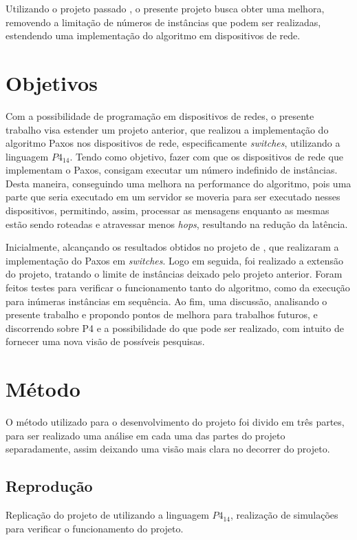 \documentclass[
    12pt,
    openright, 
    oneside,
    a4paper,
    french,
    english,
    brazil
    ]{facom-ufu-abntex2}
\theoremstyle{definition}
\begin{document}
Utilizando o projeto passado \cite{dang2016paxos}, o presente projeto busca obter uma melhora, removendo a limitação
de números de instâncias que podem ser realizadas, estendendo uma implementação do algoritmo em dispositivos de rede.

\section{Objetivos}
Com a possibilidade de programação em dispositivos de redes, o presente trabalho 
visa estender um projeto anterior, que realizou a implementação do algoritmo Paxos nos 
dispositivos de rede, especificamente \emph{switches}, utilizando a linguagem $P4_{14}$. 
Tendo como objetivo, fazer com que os dispositivos de rede que implementam o Paxos,
consigam executar um número indefinido de instâncias.
Desta maneira, conseguindo uma melhora na performance do algoritmo, pois uma parte 
que seria executado em um servidor se moveria para ser executado nesses dispositivos, permitindo,
assim, processar as mensagens enquanto as mesmas estão sendo roteadas e atravessar menos
\emph{hops}, resultando na redução da latência.

Inicialmente, alcançando os resultados obtidos no projeto de \cite{dang2016paxos}, 
que realizaram a implementação do Paxos em \emph{switches}. Logo em seguida, foi realizado a extensão
do projeto, tratando o limite de instâncias deixado pelo projeto anterior. Foram feitos testes
para verificar o funcionamento tanto do algoritmo, como da execução para inúmeras instâncias em sequência.
Ao fim, uma discussão, analisando o presente trabalho e propondo pontos de melhora para trabalhos futuros,
e discorrendo sobre P4 e a possibilidade do que pode ser realizado, com intuito de fornecer uma nova visão de
possíveis pesquisas.

\section{Método}
O método utilizado para o desenvolvimento do projeto foi divido em três partes, para
ser realizado uma análise em cada uma das partes do projeto separadamente, assim deixando uma
visão mais clara no decorrer do projeto.

\subsection{Reprodução}
Replicação do projeto de \cite{dang2016paxos} utilizando a linguagem 
$P4_{14}$, realização de simulações para verificar o funcionamento do projeto.
\end{document}
